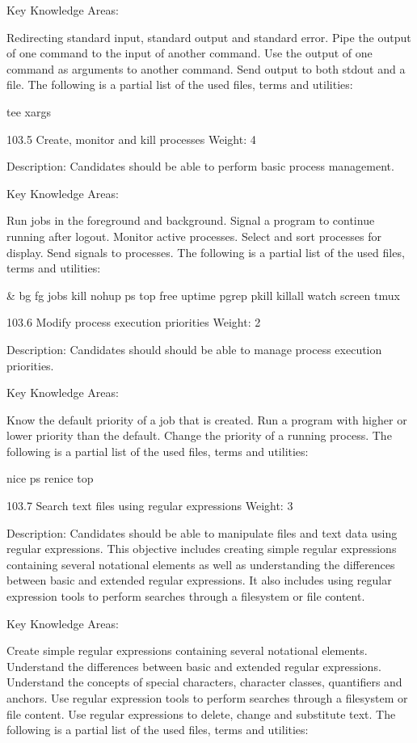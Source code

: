 Key Knowledge Areas:

Redirecting standard input, standard output and standard error.
Pipe the output of one command to the input of another command.
Use the output of one command as arguments to another command.
Send output to both stdout and a file.
The following is a partial list of the used files, terms and utilities:

tee
xargs
 

103.5 Create, monitor and kill processes
Weight: 4

Description: Candidates should be able to perform basic process management.

Key Knowledge Areas:

Run jobs in the foreground and background.
Signal a program to continue running after logout.
Monitor active processes.
Select and sort processes for display.
Send signals to processes.
The following is a partial list of the used files, terms and utilities:

&
bg
fg
jobs
kill
nohup
ps
top
free
uptime
pgrep
pkill
killall
watch
screen
tmux
 

103.6 Modify process execution priorities
Weight: 2

Description: Candidates should should be able to manage process execution priorities.

Key Knowledge Areas:

Know the default priority of a job that is created.
Run a program with higher or lower priority than the default.
Change the priority of a running process.
The following is a partial list of the used files, terms and utilities:

nice
ps
renice
top
 

103.7 Search text files using regular expressions
Weight: 3

Description: Candidates should be able to manipulate files and text data using regular expressions. This objective includes creating simple regular expressions containing several notational elements as well as understanding the differences between basic and extended regular expressions. It also includes using regular expression tools to perform searches through a filesystem or file content.

Key Knowledge Areas:

Create simple regular expressions containing several notational elements.
Understand the differences between basic and extended regular expressions.
Understand the concepts of special characters, character classes, quantifiers and anchors.
Use regular expression tools to perform searches through a filesystem or file content.
Use regular expressions to delete, change and substitute text.
The following is a partial list of the used files, terms and utilities:

